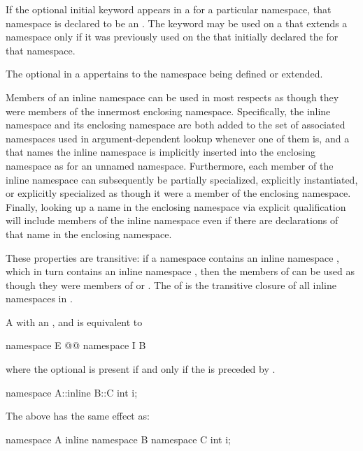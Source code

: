 \pnum
If the optional initial  keyword appears in a
 for a particular namespace, that namespace is
declared to be an . The  keyword may be
used on a  that extends a namespace
only if it was previously used on the 
that initially declared the  for that namespace.

\pnum
The optional 
in a 
appertains to the namespace being defined or extended.

\pnum
Members of an inline namespace can be used in most respects as though they were members
of the innermost enclosing namespace. Specifically, the inline namespace and its enclosing
namespace are both added to the set of associated namespaces used in
argument-dependent lookup whenever one of them is,
and a  that names the inline
namespace is implicitly inserted into the enclosing namespace as for an unnamed
namespace. Furthermore, each
member of the inline namespace can subsequently be partially
specialized, explicitly
instantiated, or explicitly specialized as
though it were a member of the enclosing namespace. Finally, looking up a name in the
enclosing namespace via explicit qualification will include
members of the inline namespace even if
there are declarations of that name in the enclosing namespace.

\pnum
These properties are transitive: if a namespace  contains an inline namespace
, which in turn contains an inline namespace , then the members of
 can be used as though they were members of  or .
The  of  is the transitive closure of all
inline namespaces in .

\pnum
A  with an
 ,
  and
 
is equivalent to
\begin{codeblock}
namespace E { @@ namespace I { B } }
\end{codeblock}
where the optional  is present if and only if
the   is preceded by .
\begin{example}
\begin{codeblock}
namespace A::inline B::C {
  int i;
}
\end{codeblock}
The above has the same effect as:
\begin{codeblock}
namespace A {
  inline namespace B {
    namespace C {
      int i;
    }
  }
}
\end{codeblock}
\end{example}

